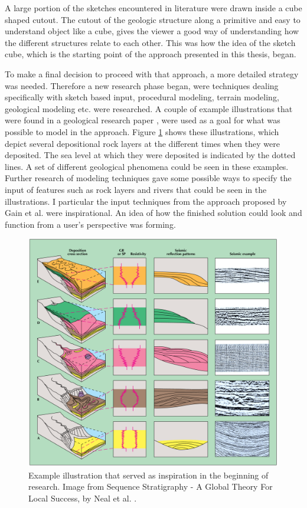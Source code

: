 \documentclass[a4paper,12pt]{report}
\begin{document}
A large portion of the sketches encountered in literature were drawn inside a cube shaped cutout. The cutout of the geologic structure along a primitive and easy to understand object like a cube, gives the viewer a good way of understanding how the different structures relate to each other. This was how the idea of the sketch cube, which is the starting point of the approach presented in this thesis, began.

To make a final decision to proceed with that approach, a more detailed strategy was needed. Therefore a new research phase began, were techniques dealing specifically with sketch based input, procedural modeling, terrain modeling, geological modeling etc. were researched. A couple of example illustrations that were found in a geological research paper \cite{neal1993sequence}, were used as a goal for what was  possible to model in the approach. Figure \ref{fig:inspiration1} shows these illustrations, which depict several depositional rock layers at the different times when they were deposited. The sea level at which they were deposited is indicated by the dotted lines. A set of different geological phenomena could be seen in these examples. Further research of modeling techniques gave some possible ways to specify the input of features such as rock layers and rivers that could be seen in the illustrations. I particular the input techniques from the approach proposed by Gain et al.\cite{Gain:2009:TS:1507149.1507155} were inspirational. An idea of how the finished solution could look and function from a user's perspective was forming.

\begin{figure}
 \includegraphics[width=\linewidth]{thesis/inspiration1.png}
 \caption{Example illustration that served as inspiration in the beginning of research. Image from Sequence Stratigraphy - A Global Theory For Local Success, by Neal et al. \cite{neal1993sequence}.}
 \label{fig:inspiration1}
\end{figure}
\end{document}
